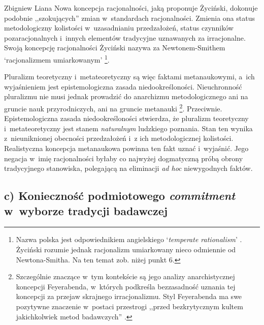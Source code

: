 \begin{artplenv}{Zbigniew Liana}
Nowa koncepcja racjonalności, jaką proponuje Życiński, dokonuje podobnie ,,szokujących'' zmian w~standardach racjonalności. Zmienia ona status metodologiczny kolistości w~uzasadnianiu przedzałożeń, status czynników pozaracjonalnych i~innych elementów tradycyjne uznawanych za irracjonalne. Swoją koncepcję racjonalności Życiński nazywa za Newtonem-Smithem ‘racjonalizmem umiarkowanym'
\parencite[][s.~205]{zycinski_teizm_1985}%
\footnote{Nazwa polska jest odpowiednikiem angielskiego `\textit{temperate rationalism}' 
\parencite[][s.~266–273]{newton-smith_rationality_1981}. %
 Życiński rozumie jednak racjonalizm umiarkowany nieco odmiennie od Newtona-Smitha. Na ten temat zob. niżej punkt 6.}.

Pluralizm teoretyczny i~metateoretyczny są więc faktami metanaukowymi, a~ich wyjaśnieniem jest epistemologiczna zasada niedookreśloności. Nieuchronność pluralizmu nie musi jednak prowadzić do anarchizmu metodologicznego ani na gruncie nauk przyrodniczych, ani na gruncie metanauki
\parencites[zob. np.][s.~183nn]{zycinski_jezyk_1983}[][s.~161n.203nn]{zycinski_teizm_1985}%
\footnote{Szczególnie znaczące w~tym kontekście są jego analizy anarchistycznej koncepcji Feyerabenda, w~których podkreśla bezzasadność uznania tej koncepcji za przejaw skrajnego irracjonalizmu. Styl Feyerabenda ma swe pozytywne znaczenie w~postaci przestrogi ,,przed bezkrytycznym kultem jakichkolwiek metod badawczych'' 
\parencites[zob.][s.~217–227, zwł. s.~220]{zycinski_elementy_1996}[][s.~295–308, zwł. s.~299n]{zycinski_elementy_2015}.%
}. Przeciwnie. Epistemologiczna zasada niedookreśloności stwierdza, że pluralizm teoretyczny i~metateoretyczny jest stanem \textit{naturalnym} ludzkiego poznania. Stan ten wynika z~nieuniknionej obecności przedzałożeń i~z ich metodologicznej kolistości. Realistyczna koncepcja metanaukowa powinna ten fakt uznać i~wyjaśnić. Jego negacja w~imię racjonalności byłaby co najwyżej dogmatyczną próbą obrony tradycyjnego stanowiska, polegającą na eliminacji \textit{ad hoc} niewygodnych faktów.

\subsection{c) Konieczność podmiotowego \textit{commitment} w~wyborze tradycji badawczej}


\end{artplenv}
